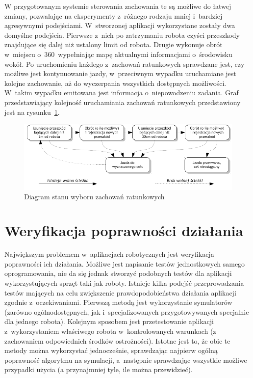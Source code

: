 W przygotowanym systemie sterowania zachowania te są możliwe do łatwej zmiany, pozwalając
na eksperymenty z~różnego rodzaju mniej i~bardziej agresywnymi podejściami. W~stworzonej
aplikacji wykorzystane zostały dwa domyślne podejścia. Pierwsze z~nich po zatrzymaniu
robota czyści przeszkody znajdujące się dalej niż ustalony limit od robota. Drugie
wykonuje obrót w~miejscu o~360\textdegree~wypełniając mapę aktualnymi informacjami
o~środowisku wokół. Po uruchomieniu każdego z~zachowań ratunkowych sprawdzane jest,
czy możliwe jest kontynuowanie jazdy, w~przeciwnym wypadku uruchamiane jest kolejne
zachowanie, aż do wyczerpania wszystkich dostępnych możliwości. W~takim wypadku
emitowana jest informacja o~niepowodzeniu zadania. Graf przedstawiający kolejność
uruchamiania zachowań ratunkowych przedstawiony jest na rysunku~\ref{fig:recovery}.

\begin{figure}[h!]
\centering
\includegraphics[width=\textwidth]{../img/recovery}
\caption{Diagram stanu wyboru zachowań ratunkowych}
\label{fig:recovery}
\end{figure}

\section{Weryfikacja poprawności działania}

Największym problemem w~aplikacjach robotycznych jest weryfikacja poprawności ich
działania. Możliwe jest napisanie testów jednostkowych samego oprogramowania,
nie da się jednak stworzyć podobnych testów dla aplikacji wykorzystujących sprzęt
taki jak roboty. Istnieje kilka podejść przeprowadzania testów mających na celu
zwiększenie prawdopodobieństwa działania aplikacji zgodnie z~oczekiwaniami.
Pierwszą metodą jest wykorzystanie symulatorów (zarówno ogólnodostępnych, jak
i~specjalizowanych przygotowywanych specjalnie dla jednego robota). Kolejnym sposobem
jest przetestowanie aplikacji z~wykorzystaniem właściwego robota w~kontrolowanych
warunkach (z zachowaniem odpowiednich środków ostrożności). Istotne jest to, że
obie te metody można wykorzystać jednocześnie, sprawdzając najpierw ogólną poprawność
algorytmu na symulacji, a~następnie sprawdzając wszystkie możliwe przypadki użycia
(a przynajmniej tyle, ile można przewidzieć).

